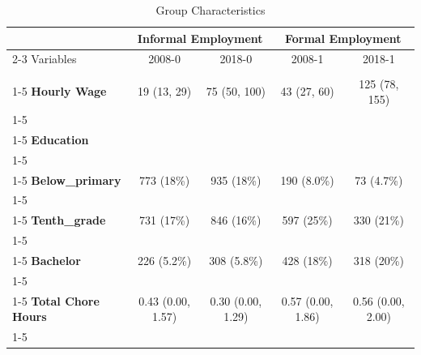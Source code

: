 \begin{table}[!h]
\centering
\caption{Group Characteristics}
\centering
\begin{tabular}[t]{>{}l|c|c|c|c}
\hline
\multicolumn{1}{c|}{ } & \multicolumn{2}{c|}{Informal Employment} & \multicolumn{2}{c}{Formal Employment} \\
\cline{2-3} \cline{4-5}
Variables & 2008-0 & 2018-0 & 2008-1 & 2018-1\\
\hline
\textbf{\cellcolor{gray!10}{Household Size}} & \cellcolor{gray!10}{5 (4, 7)} & \cellcolor{gray!10}{5 (4, 6)} & \cellcolor{gray!10}{4 (3, 6)} & \cellcolor{gray!10}{4 (3, 6)}\\
\cline{1-5}
\textbf{Hourly Wage} & 19 (13, 29) & 75 (50, 100) & 43 (27, 60) & 125 (78, 155)\\
\cline{1-5}
\textbf{\cellcolor{gray!10}{Children}} & \cellcolor{gray!10}{1 (0, 2)} & \cellcolor{gray!10}{1 (0, 2)} & \cellcolor{gray!10}{1 (0, 2)} & \cellcolor{gray!10}{1 (0, 2)}\\
\cline{1-5}
\textbf{Education} &  &  &  & \\
\cline{1-5}
\textbf{\cellcolor{gray!10}{Illiterate}} & \cellcolor{gray!10}{1,018 (23\%)} & \cellcolor{gray!10}{978 (19\%)} & \cellcolor{gray!10}{88 (3.7\%)} & \cellcolor{gray!10}{47 (3.0\%)}\\
\cline{1-5}
\textbf{Below\_primary} & 773 (18\%) & 935 (18\%) & 190 (8.0\%) & 73 (4.7\%)\\
\cline{1-5}
\textbf{\cellcolor{gray!10}{Primary}} & \cellcolor{gray!10}{1,169 (27\%)} & \cellcolor{gray!10}{1,542 (29\%)} & \cellcolor{gray!10}{332 (14\%)} & \cellcolor{gray!10}{200 (13\%)}\\
\cline{1-5}
\textbf{Tenth\_grade} & 731 (17\%) & 846 (16\%) & 597 (25\%) & 330 (21\%)\\
\cline{1-5}
\textbf{\cellcolor{gray!10}{Secondary}} & \cellcolor{gray!10}{336 (7.7\%)} & \cellcolor{gray!10}{564 (11\%)} & \cellcolor{gray!10}{502 (21\%)} & \cellcolor{gray!10}{400 (26\%)}\\
\cline{1-5}
\textbf{Bachelor} & 226 (5.2\%) & 308 (5.8\%) & 428 (18\%) & 318 (20\%)\\
\cline{1-5}
\textbf{\cellcolor{gray!10}{Masters\_above}} & \cellcolor{gray!10}{86 (2.0\%)} & \cellcolor{gray!10}{99 (1.9\%)} & \cellcolor{gray!10}{242 (10\%)} & \cellcolor{gray!10}{187 (12\%)}\\
\cline{1-5}
\textbf{Total Chore Hours} & 0.43 (0.00, 1.57) & 0.30 (0.00, 1.29) & 0.57 (0.00, 1.86) & 0.56 (0.00, 2.00)\\
\cline{1-5}

\end{tabular}
\end{table}
